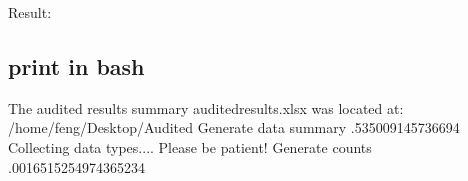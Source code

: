 \documentclass[letterpaper,12pt,english]{sphinxmanual}
\begin{document}
Result:


\subsection{print in bash}
\label{\detokenize{demo:id1}}
%
\begin{sphinxVerbatim}[commandchars=\\\{\}]
The audited results summary audited\PYGZus{}results.xlsx was located at:
/home/feng/Desktop/Audited
Generate data  summary   .535009145736694 
Collecting data types.... Please be patient!
Generate counts   .0016515254974365234 

\end{sphinxVerbatim}
\end{document}
